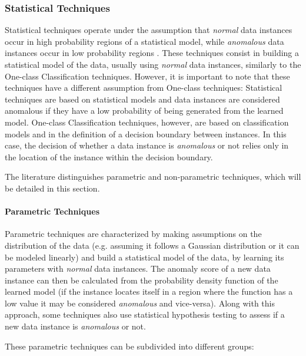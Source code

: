 \subsubsection{Statistical Techniques}

Statistical techniques operate under the assumption that \textit{normal} data instances occur in high probability regions of a statistical model, while \textit{anomalous} data instances occur in low probability regions \cite{Kandhari2009}.
These techniques consist in building a statistical model of the data, usually using \textit{normal} data instances, similarly to the One-class Classification techniques. However, it is important to note that these techniques have a different assumption from One-class techniques: Statistical techniques are based on statistical models and data instances are considered anomalous if they have a low probability of being generated from the learned model. One-class Classification techniques, however, are based on classification models and in the definition of a decision boundary between instances. In this case, the decision of whether a data instance is \textit{anomalous} or not relies only in the location of the instance within the decision boundary.

The literature distinguishes parametric and non-parametric techniques, which will be detailed in this section.

\paragraph{Parametric Techniques}\mbox{}

Parametric techniques are characterized by making assumptions on the distribution of the data (e.g. assuming it follows a Gaussian distribution or it can be modeled linearly) and build a statistical model of the data, by learning its parameters with \textit{normal} data instances.
The anomaly score of a new data instance can then be calculated from the probability density function of the learned model (if the instance locates itself in a region where the function has a low value it may be considered \textit{anomalous} and vice-versa).
Along with this approach, some techniques also use statistical hypothesis testing to assess if a new data instance is \textit{anomalous} or not.

These parametric techniques can be subdivided into different groups:

